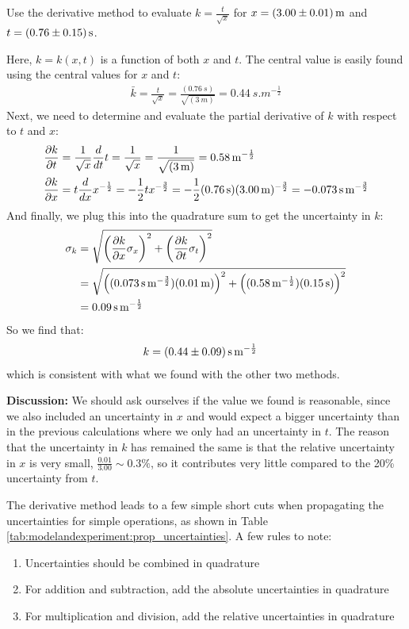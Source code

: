 \begin{example}{\label{ex:modelandexperiment:derivprop} Use the derivative method to evaluate $k=\frac{t}{\sqrt{x}}$ for $x=\SI{3.00 \pm 0.01}{m}$ and $t=\SI{0.76\pm0.15}{s}$.}

Here, $k=k(x,t)$ is a function of both $x$ and $t$. The central value is easily found using the central values for $x$ and $t$:
\begin{align*}
\bar k = \frac{t}{\sqrt{x}} = \frac{(\SI{0.76}{s})}{\sqrt{(\SI{3}{m})}}=\SI{0.44}{s.m^{-\frac{1}{2}}}\end{align*}
Next, we need to determine and evaluate the partial derivative of $k$ with respect to $t$ and $x$:\\
\begin{align*}
\frac{\partial k}{\partial t}&=\frac{1}{\sqrt{x}}\frac{d}{dt}t=\frac{1}{\sqrt{x}}=\frac{1}{\sqrt{(\SI{3}{m})}}=\SI{0.58}{m^{-\frac{1}{2}}}\\
\frac{\partial k}{\partial x}&=t\frac{d}{dx}x^{-\frac{1}{2}}=-\frac{1}{2}tx^{-\frac{3}{2}}= -\frac{1}{2}(\SI{0.76}{s})(\SI{3.00}{m})^{-\frac{3}{2}}=-\SI{0.073}{s.m^{-\frac{3}{2}}}
\end{align*}
And finally, we plug this into the quadrature sum to get the uncertainty in $k$:\\
\begin{align*}
\sigma_k&=\sqrt{\left(\frac{\partial k}{\partial x}\sigma_x \right)^2 + \left(\frac{\partial k}{\partial t}\sigma_t \right)^2 }\\
&= \sqrt{\left((\SI{0.073}{s.m^{-\frac{3}{2}}}) (\SI{0.01}{m}) \right)^2 + \left((\SI{0.58}{m^{-\frac{1}{2}}})(\SI{0.15}{s}) \right)^2 } \\
&=\SI{0.09}{s.m^{-\frac{1}{2}}}
\end{align*}
So we find that:
\begin{align*}
k&= \SI{0.44 \pm 0.09}{s.m^{-\frac{1}{2}}}
\end{align*}
which is consistent with what we found with the other two methods.

\textbf{Discussion:} We should ask ourselves if the value we found is reasonable, since we also included an uncertainty in $x$ and would expect a bigger uncertainty than in the previous calculations where we only had an uncertainty in $t$. The reason that the uncertainty in $k$ has remained the same is that the relative uncertainty in $x$ is very small, $\frac{0.01}{3.00}\sim 0.3\%$, so it contributes very little compared to the 20\% uncertainty from $t$. 
\end{example}

The derivative method leads to a few simple short cuts when propagating the uncertainties for simple operations, as shown in Table \ref{tab:modelandexperiment:prop_uncertainties}. A few rules to note:
\begin{enumerate}
\item Uncertainties should be combined in quadrature
\item For addition and subtraction, add the absolute uncertainties in quadrature
\item For multiplication and division, add the relative uncertainties in quadrature
\end{enumerate}

